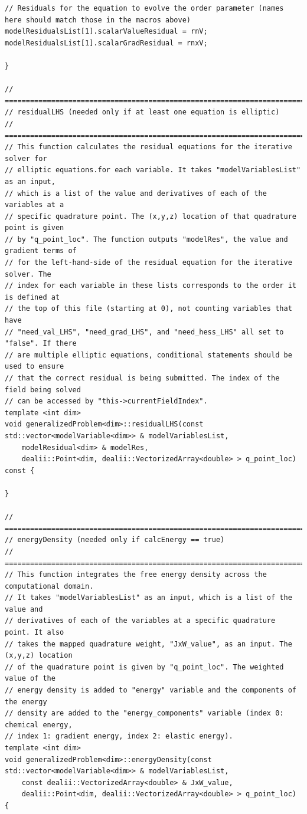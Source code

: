 \documentclass[10pt]{article} %
\begin{document}
\begin{lstlisting}
// Residuals for the equation to evolve the order parameter (names here should match those in the macros above)
modelResidualsList[1].scalarValueResidual = rnV;
modelResidualsList[1].scalarGradResidual = rnxV;

}

// =================================================================================
// residualLHS (needed only if at least one equation is elliptic)
// =================================================================================
// This function calculates the residual equations for the iterative solver for
// elliptic equations.for each variable. It takes "modelVariablesList" as an input,
// which is a list of the value and derivatives of each of the variables at a
// specific quadrature point. The (x,y,z) location of that quadrature point is given
// by "q_point_loc". The function outputs "modelRes", the value and gradient terms of
// for the left-hand-side of the residual equation for the iterative solver. The
// index for each variable in these lists corresponds to the order it is defined at
// the top of this file (starting at 0), not counting variables that have
// "need_val_LHS", "need_grad_LHS", and "need_hess_LHS" all set to "false". If there
// are multiple elliptic equations, conditional statements should be used to ensure
// that the correct residual is being submitted. The index of the field being solved
// can be accessed by "this->currentFieldIndex".
template <int dim>
void generalizedProblem<dim>::residualLHS(const std::vector<modelVariable<dim>> & modelVariablesList,
	modelResidual<dim> & modelRes,
	dealii::Point<dim, dealii::VectorizedArray<double> > q_point_loc) const {

}

// =================================================================================
// energyDensity (needed only if calcEnergy == true)
// =================================================================================
// This function integrates the free energy density across the computational domain.
// It takes "modelVariablesList" as an input, which is a list of the value and
// derivatives of each of the variables at a specific quadrature point. It also
// takes the mapped quadrature weight, "JxW_value", as an input. The (x,y,z) location
// of the quadrature point is given by "q_point_loc". The weighted value of the
// energy density is added to "energy" variable and the components of the energy
// density are added to the "energy_components" variable (index 0: chemical energy,
// index 1: gradient energy, index 2: elastic energy).
template <int dim>
void generalizedProblem<dim>::energyDensity(const std::vector<modelVariable<dim>> & modelVariablesList,
	const dealii::VectorizedArray<double> & JxW_value,
	dealii::Point<dim, dealii::VectorizedArray<double> > q_point_loc) {


\end{lstlisting}
\end{document}
